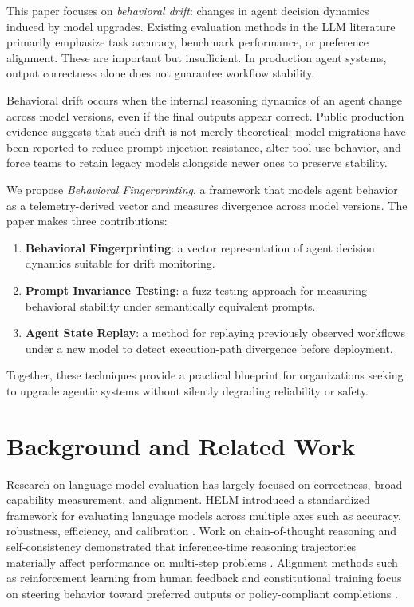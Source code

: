 \documentclass[11pt]{article}
\begin{document}
This paper focuses on \emph{behavioral drift}: changes in agent decision dynamics induced by model upgrades. Existing evaluation methods in the LLM literature primarily emphasize task accuracy, benchmark performance, or preference alignment. These are important but insufficient. In production agent systems, output correctness alone does not guarantee workflow stability.

Behavioral drift occurs when the internal reasoning dynamics of an agent change across model versions, even if the final outputs appear correct. Public production evidence suggests that such drift is not merely theoretical: model migrations have been reported to reduce prompt-injection resistance, alter tool-use behavior, and force teams to retain legacy models alongside newer ones to preserve stability.

We propose \emph{Behavioral Fingerprinting}, a framework that models agent behavior as a telemetry-derived vector and measures divergence across model versions. The paper makes three contributions:

\begin{enumerate}[leftmargin=*, itemsep=0.3em]
    \item \textbf{Behavioral Fingerprinting}: a vector representation of agent decision dynamics suitable for drift monitoring.
    \item \textbf{Prompt Invariance Testing}: a fuzz-testing approach for measuring behavioral stability under semantically equivalent prompts.
    \item \textbf{Agent State Replay}: a method for replaying previously observed workflows under a new model to detect execution-path divergence before deployment.
\end{enumerate}

Together, these techniques provide a practical blueprint for organizations seeking to upgrade agentic systems without silently degrading reliability or safety.

\section{Background and Related Work}
Research on language-model evaluation has largely focused on correctness, broad capability measurement, and alignment. HELM introduced a standardized framework for evaluating language models across multiple axes such as accuracy, robustness, efficiency, and calibration \cite{liang2022helm}. Work on chain-of-thought reasoning and self-consistency demonstrated that inference-time reasoning trajectories materially affect performance on multi-step problems \cite{wei2022chain, wang2023selfconsistency}. Alignment methods such as reinforcement learning from human feedback and constitutional training focus on steering behavior toward preferred outputs or policy-compliant completions \cite{ouyang2022rlhf, bai2022constitutional}.
\end{document}
